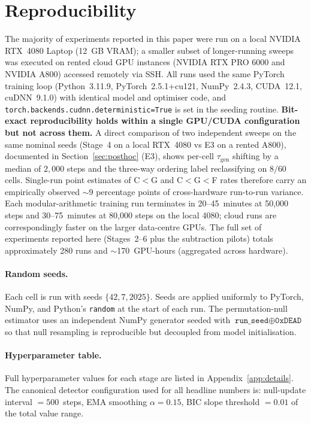 \documentclass{article}
\newcommand{\taug}{\tau_{\mathrm{gen}}}
\begin{document}
\section{Reproducibility}
\label{app:reproducibility}

The majority of experiments reported in this paper were run on a
local NVIDIA RTX~4080 Laptop (12~GB VRAM); a smaller subset of
longer-running sweeps was executed on rented cloud GPU instances
(NVIDIA RTX PRO 6000 and NVIDIA A800) accessed remotely via SSH.
All runs used the same PyTorch training loop
(Python~3.11.9, PyTorch~2.5.1+cu121, NumPy~2.4.3,
CUDA~12.1, cuDNN~9.1.0)
with identical model and optimiser code,
and \texttt{torch.backends.cudnn.deterministic=True} is set in the
seeding routine.
\textbf{Bit-exact reproducibility holds within a single GPU/CUDA
configuration but not across them.}
A direct comparison of two independent sweeps on the same nominal
seeds (Stage~4 on a local RTX~4080 vs E3 on a rented A800),
documented in Section~\ref{sec:posthoc} (E3), shows per-cell
$\taug$ shifting by a median of $2{,}000$ steps and the three-way
ordering label reclassifying on $8/60$ cells.
Single-run point estimates of C$<$G and C$<$G$<$F rates therefore
carry an empirically observed $\sim$$9$ percentage points of
cross-hardware run-to-run variance.
Each modular-arithmetic training run terminates in
\mbox{20--45~minutes} at 50{,}000 steps and \mbox{30--75~minutes} at
80{,}000 steps on the local 4080; cloud runs are correspondingly
faster on the larger data-centre GPUs.
The full set of experiments reported here (Stages~2--6 plus the
subtraction pilots) totals approximately 280 runs and
\mbox{$\sim$170~GPU-hours} (aggregated across hardware).

\paragraph{Random seeds.}
Each cell is run with seeds $\{42, 7, 2025\}$.
Seeds are applied uniformly to PyTorch, NumPy, and Python's
\texttt{random} at the start of each run.
The permutation-null estimator uses an independent NumPy generator
seeded with $\texttt{run\_seed}\oplus\texttt{0xDEAD}$ so that null
resampling is reproducible but decoupled from model initialisation.

\paragraph{Hyperparameter table.}
Full hyperparameter values for each stage are listed in
Appendix~\ref{app:details}.
The canonical detector configuration used for all headline numbers
is: null-update interval $=500$~steps, EMA smoothing
$\alpha=0.15$, BIC slope threshold $=0.01$ of the total value range.
\end{document}
